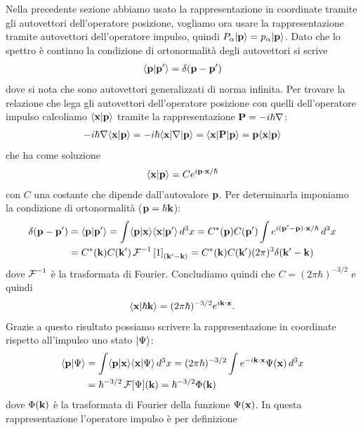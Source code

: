 Nella precedente sezione abbiamo usato la rappresentazione in coordinate tramite gli autovettori dell'operatore posizione, vogliamo ora usare la 
rappresentazione tramite autovettori dell'operatore impulso, quindi $ P_\alpha \vert \mathbf{p} \rangle = p_\alpha\vert \mathbf{p} \rangle $. Dato che lo spettro è continuo la 
condizione di ortonormalità degli autovettori si scrive 
\begin{align*}
  \langle \mathbf{p} | \mathbf{p'} \rangle = \delta(\mathbf{p - p'})
\end{align*}
dove si nota che sono autovettori generalizzati di norma infinita. Per trovare la relazione che lega gli autovettori dell'operatore posizione con quelli 
dell'operatore impulso calcoliamo $ \langle \mathbf{x} | \mathbf{p} \rangle $ tramite la rappresentazione $ \mathbf{P} = -i \hbar \nabla $:
\begin{align*}
  -i \hbar \nabla \langle \mathbf{x}|\mathbf{p} \rangle = -i \hbar \langle \mathbf{x} | \nabla |\mathbf{p} \rangle = \langle \mathbf{x} | \mathbf{P} | \mathbf{p} \rangle = \mathbf{p} \langle \mathbf{x} | \mathbf{p} \rangle
\end{align*}
che ha come soluzione 
\begin{align*}
  \langle \mathbf{x | p} \rangle = C e^{i \mathbf{p \cdot x}/\hbar}
\end{align*}
con $ C $ una costante che dipende dall'autovalore $ \mathbf{p} $. Per determinarla imponiamo la condizione di ortonormalità ($ \mathbf{p} = \hbar \mathbf{k}$):
\begin{align*}
  \delta(\mathbf{p - p'}) &= \langle \mathbf{p|p'} \rangle = \int \langle \mathbf{p | x} \rangle \langle \mathbf{x | p'} \rangle \,d^3x = C^*(\mathbf{p}) C(\mathbf{p'}) \int e^{i (\mathbf{p' - p})\cdot \mathbf{x} /\hbar}\,d^3x 
  \\
  &= C^*(\mathbf{k}) C(\mathbf{k'}) \operatorname{\mathcal{F}}^{-1}\left[ 1 \right]_{\left(\mathbf{k' - k} \right)} = C^*(\mathbf{k}) C(\mathbf{k'}) (2\pi)^3 \delta(\mathbf{k' - k})
\end{align*}
dove $ \operatorname{\mathcal{F}}^{-1} $ è la trasformata di Fourier. Concludiamo quindi che $ C = (2 \pi \hbar)^{-3/2} $ e quindi 
\begin{align*}
  \langle \mathbf{x | \hbar k} \rangle = (2 \pi \hbar)^{-3/2} e^{i \mathbf{k \cdot x}}.
\end{align*}
Grazie a questo risultato possiamo scrivere la rappresentazione in coordinate rispetto all'impulso uno stato $ \vert \Psi \rangle $:
\begin{align*}
  \langle \mathbf{p} | \Psi \rangle &= \int \langle \mathbf{p} | \mathbf{x} \rangle \langle \mathbf{x} | \Psi \rangle \,d^3x = (2 \pi \hbar)^{-3/2} \int e^{ - i \mathbf{k \cdot x}} \Psi(\mathbf{x}) \,d^3x 
  \\
  &= \hbar^{-3/2} \operatorname{\mathcal{F}}[\Psi](\mathbf{k}) = \hbar^{-3/2} \Phi(\mathbf{k})
\end{align*}
dove $ \Phi(\mathbf{k}) $ è la trasformata di Fourier della funzione $ \Psi(\mathbf{x}) $. In questa rappresentazione l'operatore impulso è per definizione 
